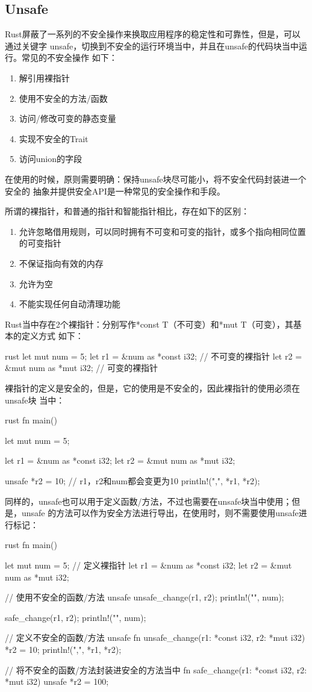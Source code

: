 \subsection{Unsafe}
Rust屏蔽了一系列的不安全操作来换取应用程序的稳定性和可靠性，但是，可以通过关键字
unsafe，切换到不安全的运行环境当中，并且在unsafe的代码块当中运行。常见的不安全操作
如下：
\begin{enumerate}
  \item 解引用裸指针
  \item 使用不安全的方法/函数
  \item 访问/修改可变的静态变量
  \item 实现不安全的Trait
  \item 访问union的字段
\end{enumerate}
在使用的时候，原则需要明确：保持unsafe块尽可能小，将不安全代码封装进一个安全的
抽象并提供安全API是一种常见的安全操作和手段。

所谓的裸指针，和普通的指针和智能指针相比，存在如下的区别：
\begin{enumerate}
  \item 允许忽略借用规则，可以同时拥有不可变和可变的指针，或多个指向相同位置的可变指针
  \item 不保证指向有效的内存
  \item 允许为空
  \item 不能实现任何自动清理功能
\end{enumerate}
Rust当中存在2个裸指针：分别写作*const T（不可变）和*mut T（可变），其基本的定义方式
如下：
\begin{code-block}{rust}
let mut num = 5;
let r1 = &num as *const i32; // 不可变的裸指针
let r2 = &mut num as *mut i32; // 可变的裸指针
\end{code-block}

裸指针的定义是安全的，但是，它的使用是不安全的，因此裸指针的使用必须在unsafe块
当中：
\begin{code-block}{rust}
fn main() {
    let mut num = 5;

    let r1 = &num as *const i32;
    let r2 = &mut num as *mut i32;

    unsafe {
        *r2 = 10;
        // r1，r2和num都会变更为10
        println!("{},{}", *r1, *r2);
    }
}
\end{code-block}
同样的，unsafe也可以用于定义函数/方法，不过也需要在unsafe块当中使用；但是，unsafe
的方法可以作为安全方法进行导出，在使用时，则不需要使用unsafe进行标记：
\begin{code-block}{rust}
fn main() {
    let mut num = 5;
    // 定义裸指针
    let r1 = &num as *const i32;
    let r2 = &mut num as *mut i32;

    // 使用不安全的函数/方法
    unsafe {
        unsafe_change(r1, r2);
    }
    println!("{}", num);

    safe_change(r1, r2);
    println!("{}", num);
}

// 定义不安全的函数/方法
unsafe fn unsafe_change(r1: *const i32, r2: *mut i32) {
    *r2 = 10;
    println!("{},{}", *r1, *r2);
}

// 将不安全的函数/方法封装进安全的方法当中
fn safe_change(r1: *const i32, r2: *mut i32) {
    unsafe {
        *r2 = 100;
    }
}
\end{code-block}


